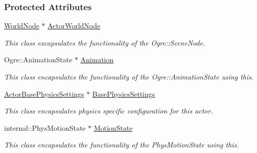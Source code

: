 \subsubsection*{Protected Attributes}
\begin{DoxyCompactItemize}
\item 
\hypertarget{classMezzanine_1_1ActorBase_a6dbfa117e36ab443af4509399b6c4fc9}{
\hyperlink{classMezzanine_1_1WorldNode}{WorldNode} $\ast$ \hyperlink{classMezzanine_1_1ActorBase_a6dbfa117e36ab443af4509399b6c4fc9}{ActorWorldNode}}
\label{classMezzanine_1_1ActorBase_a6dbfa117e36ab443af4509399b6c4fc9}

\begin{DoxyCompactList}\small\item\em This class excapsulates the functionality of the Ogre::SceneNode. \item\end{DoxyCompactList}\item 
\hypertarget{classMezzanine_1_1ActorBase_ae71259b98aed5a9c269e0758344d36a7}{
Ogre::AnimationState $\ast$ \hyperlink{classMezzanine_1_1ActorBase_ae71259b98aed5a9c269e0758344d36a7}{Animation}}
\label{classMezzanine_1_1ActorBase_ae71259b98aed5a9c269e0758344d36a7}

\begin{DoxyCompactList}\small\item\em This class encapsulates the functionality of the Ogre::AnimationState using this. \item\end{DoxyCompactList}\item 
\hypertarget{classMezzanine_1_1ActorBase_a6171cd6b5d94263d0c339bf5e299fa26}{
\hyperlink{classMezzanine_1_1ActorBasePhysicsSettings}{ActorBasePhysicsSettings} $\ast$ \hyperlink{classMezzanine_1_1ActorBase_a6171cd6b5d94263d0c339bf5e299fa26}{BasePhysicsSettings}}
\label{classMezzanine_1_1ActorBase_a6171cd6b5d94263d0c339bf5e299fa26}

\begin{DoxyCompactList}\small\item\em This class encapsulates physics specific configuration for this actor. \item\end{DoxyCompactList}\item 
\hypertarget{classMezzanine_1_1ActorBase_a073d5307c4cb7a82f13133e8216f797b}{
internal::PhysMotionState $\ast$ \hyperlink{classMezzanine_1_1ActorBase_a073d5307c4cb7a82f13133e8216f797b}{MotionState}}
\label{classMezzanine_1_1ActorBase_a073d5307c4cb7a82f13133e8216f797b}

\begin{DoxyCompactList}\small\item\em This class encapsulates the functionality of the PhysMotionState using this. \item\end{DoxyCompactList}\end{DoxyCompactItemize}
